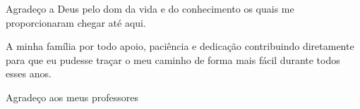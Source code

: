 
\begin{agradecimentos}[AGRADECIMENTOS]

Agradeço a Deus pelo dom da vida e do conhecimento os quais me proporcionaram chegar até aqui. 

A minha família por todo apoio, paciência e dedicação contribuindo diretamente para que eu pudesse traçar o meu caminho de forma mais fácil durante todos esses anos.

Agradeço aos meus professores

\end{agradecimentos}
